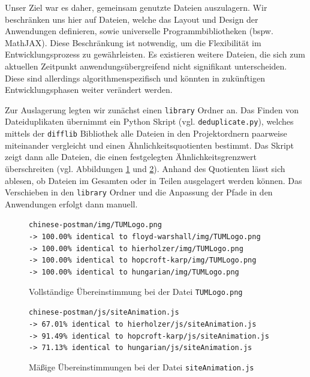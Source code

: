 Unser Ziel war es daher, gemeinsam genutzte Dateien auszulagern. Wir beschränken uns hier auf Dateien, welche das Layout und Design der Anwendungen definieren, sowie universelle Programmbibliotheken (bspw. MathJAX). Diese Beschränkung ist notwendig, um die Flexibilität im Entwicklungsprozess zu gewährleisten. Es existieren weitere Dateien, die sich zum aktuellen Zeitpunkt anwendungsübergreifend nicht signifikant unterscheiden. Diese sind allerdings algorithmenspezifisch und könnten in zukünftigen Entwicklungsphasen weiter verändert werden.

Zur Auslagerung legten wir zunächst einen \texttt{library} Ordner an. Das Finden von Dateiduplikaten übernimmt ein Python Skript (vgl. \texttt{deduplicate.py}), welches mittels der \texttt{difflib} Bibliothek alle Dateien in den Projektordnern paarweise miteinander vergleicht und einen Ähnlichkeitsquotienten bestimmt. Das Skript zeigt dann alle Dateien, die einen festgelegten Ähnlichkeitsgrenzwert überschreiten (vgl. Abbildungen \ref{fig:shared-files-1} und \ref{fig:shared-files-2}). Anhand des Quotienten lässt sich ablesen, ob Dateien im Gesamten oder in Teilen ausgelagert werden können. Das Verschieben in den \texttt{library} Ordner und die Anpassung der Pfade in den Anwendungen erfolgt dann manuell.

\begin{figure}[h!]
\noindent\texttt{chinese-postman/img/TUMLogo.png \\
-> 100.00\% identical to floyd-warshall/img/TUMLogo.png \\
-> 100.00\% identical to hierholzer/img/TUMLogo.png \\
-> 100.00\% identical to hopcroft-karp/img/TUMLogo.png \\
-> 100.00\% identical to hungarian/img/TUMLogo.png
}
\caption[Gemeinsame Dateien: Beispiel 1]{Vollständige Übereinstimmung bei der Datei \texttt{TUMLogo.png}}\label{fig:shared-files-1}
\end{figure}

\begin{figure}[h!]
\noindent\texttt{chinese-postman/js/siteAnimation.js \\
-> 67.01\% identical to hierholzer/js/siteAnimation.js \\
-> 91.49\% identical to hopcroft-karp/js/siteAnimation.js \\
-> 71.13\% identical to hungarian/js/siteAnimation.js
}
\caption[Gemeinsame Dateien: Beispiel 2]{Mäßige Übereinstimmungen bei der Datei \texttt{siteAnimation.js}}\label{fig:shared-files-2}
\end{figure}

